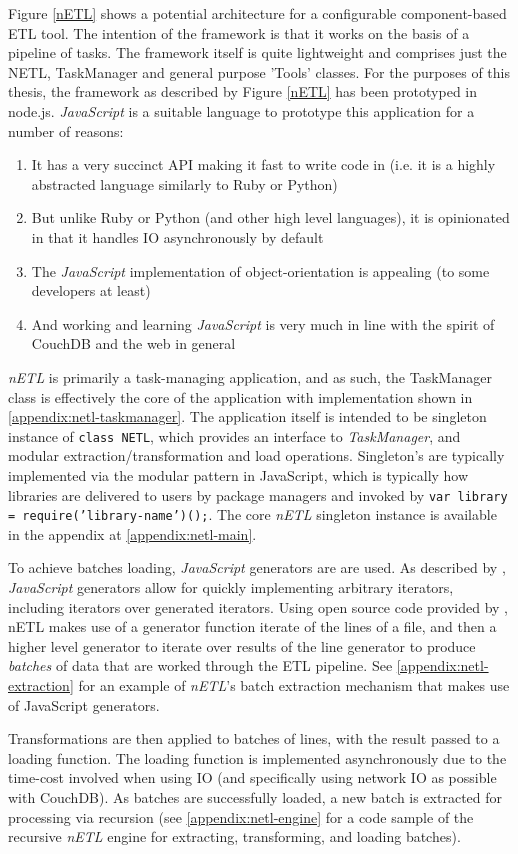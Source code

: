 Figure \ref{nETL} shows a potential architecture for a configurable component-based ETL tool. The intention of the framework is that it works on the basis of a pipeline of tasks. The framework itself is quite lightweight and comprises just the NETL, TaskManager and general purpose 'Tools' classes. For the purposes of this thesis, the framework as described by Figure \ref{nETL} has been prototyped in node.js. \textit{JavaScript} is a suitable language to prototype this application for a number of reasons:

\begin{enumerate}
    \item It has a very succinct API making it fast to write code in (i.e. it is a highly abstracted language similarly to Ruby or Python)
    \item But unlike Ruby or Python (and other high level languages), it is opinionated in that it handles IO asynchronously by default
    \item The \textit{JavaScript} implementation of object-orientation is appealing (to some developers at least)
    \item And working and learning \textit{JavaScript} is very much in line with the spirit of CouchDB and the web in general
\end{enumerate}

\textit{nETL} is primarily a task-managing application, and as such, the TaskManager class is effectively the core of the application with implementation shown in \ref{appendix:netl-taskmanager}. The application itself is intended to be singleton instance of \texttt{class NETL{}}, which provides an interface to \textit{TaskManager}, and modular extraction/transformation and load operations. Singleton's are typically implemented via the modular pattern in JavaScript, which is typically how libraries are delivered to users by package managers and invoked by \texttt{var library = require('library-name')();}. The core \textit{nETL} singleton instance is available in the appendix at \ref{appendix:netl-main}.

To achieve batches loading, \textit{JavaScript} generators are are used. As described by \cite{mozillaGenerators}, \textit{JavaScript} generators allow for quickly implementing arbitrary iterators, including iterators over generated iterators. Using open source code provided by \cite{bower16}, nETL makes use of a generator function iterate of the lines of a file, and then a higher level generator to iterate over results of the line generator to produce \textit{batches} of data that are worked through the ETL pipeline. See \ref{appendix:netl-extraction} for an example of \textit{nETL}'s batch extraction mechanism that makes use of JavaScript generators.

Transformations are then applied to batches of lines, with the result passed to a loading function. The loading function is implemented asynchronously due to the time-cost involved when using IO (and specifically using network IO as possible with CouchDB). As batches are successfully loaded, a new batch is extracted for processing via recursion (see \ref{appendix:netl-engine} for a code sample of the recursive \textit{nETL} engine for extracting, transforming, and loading batches).